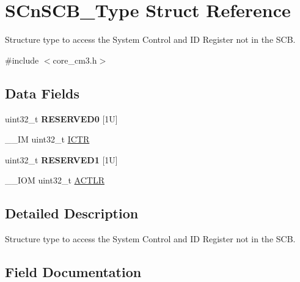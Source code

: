 \hypertarget{struct_s_cn_s_c_b___type}{}\section{S\+Cn\+S\+C\+B\+\_\+\+Type Struct Reference}
\label{struct_s_cn_s_c_b___type}


Structure type to access the System Control and ID Register not in the S\+CB.  




{\ttfamily \#include $<$core\+\_\+cm3.\+h$>$}

\subsection*{Data Fields}
\begin{DoxyCompactItemize}
\item 
\mbox{\label{struct_s_cn_s_c_b___type_affae06cd6df5e9fe9a92994052fd3bec}} 
uint32\+\_\+t {\bfseries R\+E\+S\+E\+R\+V\+E\+D0} \mbox{[}1\+U\mbox{]}
\item 
\+\_\+\+\_\+\+IM uint32\+\_\+t \mbox{\hyperlink{struct_s_cn_s_c_b___type_acf9b76331abd768af25a10b3625da4b4}{I\+C\+TR}}
\item 
\mbox{\label{struct_s_cn_s_c_b___type_aaa45b15c650670f4f84000a1f419ca00}} 
uint32\+\_\+t {\bfseries R\+E\+S\+E\+R\+V\+E\+D1} \mbox{[}1\+U\mbox{]}
\item 
\+\_\+\+\_\+\+I\+OM uint32\+\_\+t \mbox{\hyperlink{struct_s_cn_s_c_b___type_afabed911b9f91f9df848999e1b5d6504}{A\+C\+T\+LR}}
\end{DoxyCompactItemize}


\subsection{Detailed Description}
Structure type to access the System Control and ID Register not in the S\+CB. 

\subsection{Field Documentation}
\mbox{\label{struct_s_cn_s_c_b___type_afabed911b9f91f9df848999e1b5d6504}} 

